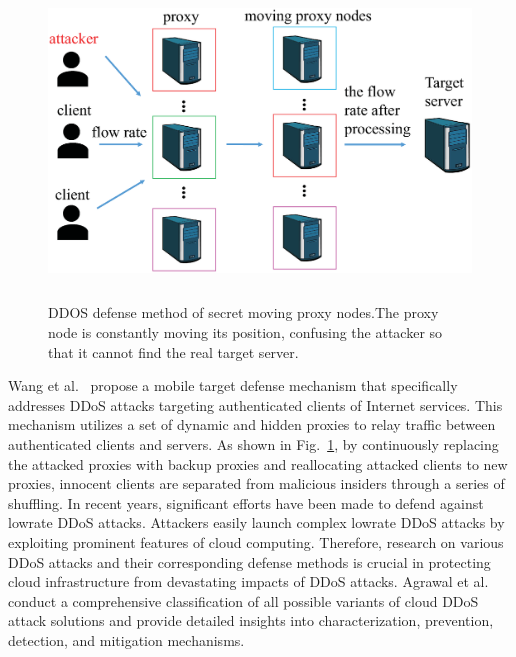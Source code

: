 \documentclass[pdflatex,sn-mathphys-num]{sn-jnl}%
\theoremstyle{thmstyleone}%
\theoremstyle{thmstyletwo}%
\theoremstyle{thmstylethree}%
\begin{document}
\begin{figure}[h]
	\centering
	\includegraphics[width=1.0\linewidth,height=3.3in]{output/fig18.eps}
	\caption{DDOS defense method of secret moving proxy nodes.The
		proxy node is constantly moving its position, confusing the attacker
		so that it cannot find the real target server.}
	\label{fig18}
\end{figure}


Wang et al.~\cite{wang2014moving} propose a mobile target defense mechanism that specifically
addresses DDoS attacks targeting authenticated clients of Internet services.
This mechanism utilizes a set of dynamic and hidden proxies to relay traﬀic
between authenticated clients and servers. As shown in Fig.~\ref{fig18}, by continuously
replacing the attacked proxies with backup proxies and reallocating attacked
clients to new proxies, innocent clients are separated from malicious insiders
through a series of shuffling. In recent years, significant efforts have been
made to defend against lowrate DDoS attacks. Attackers easily launch complex
lowrate DDoS attacks by exploiting prominent features of cloud computing.
Therefore, research on various DDoS attacks and their corresponding defense
methods is crucial in protecting cloud infrastructure from devastating impacts
of DDoS attacks. Agrawal et al.~\cite{agrawal2019defense} conduct a comprehensive classification of
all possible variants of cloud DDoS attack solutions and provide detailed
insights into characterization, prevention, detection, and mitigation mechanisms.
\end{document}
